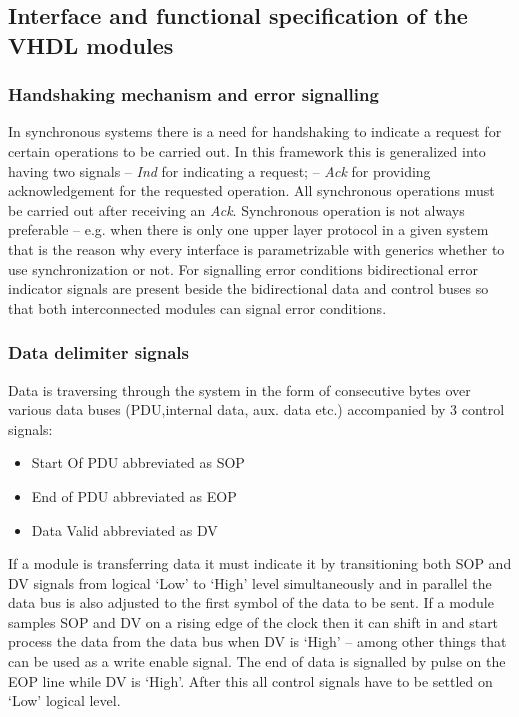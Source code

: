 \documentclass[conference]{IEEEtran}
\begin{document}
\subsection{Interface and functional specification of the VHDL modules}\label{subsec:if_and_func_spec_VHDL}

\subsubsection{Handshaking mechanism and error signalling}
In synchronous systems there is a need for handshaking to indicate a request for certain operations to be carried out. In this framework this is generalized into having two signals -- \emph{Ind} for indicating a request; -- \emph{Ack} for providing acknowledgement for the requested operation. All synchronous operations must be carried out after receiving an \emph{Ack}. Synchronous operation is not always preferable -- e.g. when there is only one upper layer protocol in a given system that is the reason why every interface is parametrizable with generics whether to use synchronization or not.
For signalling error conditions bidirectional error indicator signals are present beside the bidirectional data and control buses so that both interconnected modules can signal error conditions.

\subsubsection{Data delimiter signals}

Data is traversing through the system in the form of consecutive bytes over various data buses (PDU,internal data, aux. data etc.) accompanied by 3 control signals:
\begin{itemize}
\renewcommand \labelitemi{--}
\item Start Of PDU abbreviated as SOP
\item End of PDU abbreviated as EOP
\item Data Valid abbreviated as DV
\end{itemize}
If a module is transferring data it must indicate it by transitioning both SOP and DV signals from logical `Low' to `High' level simultaneously and in parallel the data bus is also adjusted to the first symbol of the data to be sent. If a module samples SOP and DV on a rising edge of the clock then it can shift in and start process the data from the data bus when DV is `High' -- among other things that can be used as a write enable signal. The end of data is signalled by pulse on the EOP line while DV is `High'. After this all control signals have to be settled on `Low' logical level.
\end{document}
